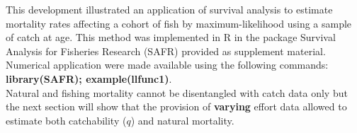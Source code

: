 This development illustrated an application of survival analysis to estimate mortality rates affecting a cohort of fish by maximum-likelihood using a sample of catch at age. This method was implemented in R \citep{R} in the package Survival Analysis for Fisheries Research (SAFR) provided as supplement material. Numerical application were made available using the following commands: {\bf library(SAFR); example(llfunc1)}.\\

Natural and fishing mortality cannot be disentangled with catch data only but the next section will show that the provision of {\bf varying}  effort data allowed to estimate both catchability ($q$) and natural mortality.
